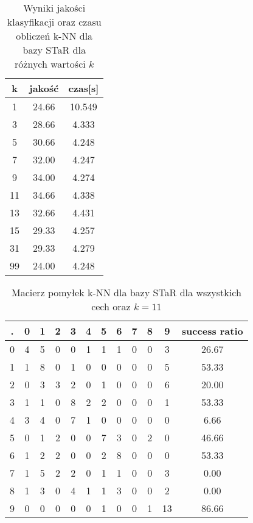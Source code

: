 \documentclass{classrep}
\begin{document}
\begin{table}[h!]
  \centering
  \caption{Wyniki jakości klasyfikacji oraz czasu obliczeń k-NN dla bazy STaR dla różnych wartości $k$}
  \label{tab:tab1}
  \begin{tabular}{|c|c|c|}
    \hline
	k & jakość & czas[s]\\
    \hline
	1 & 24.66 & 10.549\\
    \hline
	3 & 28.66 & 4.333\\
	\hline
	5 & 30.66 & 4.248\\
	\hline
	7 & 32.00 & 4.247\\
	\hline
	9 & 34.00 & 4.274\\
	\hline
	11 & 34.66 & 4.338\\
	\hline
	13 & 32.66 & 4.431\\
	\hline
	15 & 29.33 & 4.257\\
	\hline
	31 & 29.33 & 4.279\\
	\hline
	99 & 24.00 & 4.248\\
	\hline
  \end{tabular}
\end{table}

\begin{table}[h!]
  \centering
  \caption{Macierz pomyłek k-NN dla bazy STaR dla wszystkich cech oraz $k=11$}
  \label{tab:tab1}
  \begin{tabular}{|c|c|c|c|c|c|c|c|c|c|c|c|}
    \hline
	. & 0 & 1 & 2 & 3 & 4 & 5 & 6 & 7 & 8 & 9 & success ratio \\
    \hline
	0 & 4 & 5 & 0 & 0 & 1 & 1 & 1 & 0 & 0 & 3 & 26.67\\
    \hline
	1 & 1 & 8 & 0 & 1 & 0 & 0 & 0 & 0 & 0 & 5 & 53.33\\
	\hline
	2 & 0 & 3 & 3 & 2 & 0 & 1 & 0 & 0 & 0 & 6 & 20.00\\
	\hline
	3 & 1 & 1 & 0 & 8 & 2 & 2 & 0 & 0 & 0 & 1 & 53.33\\
	\hline
	4 & 3 & 4 & 0 & 7 & 1 & 0 & 0 & 0 & 0 & 0 & 6.66\\
	\hline
	5 & 0 & 1 & 2 & 0 & 0 & 7 & 3 & 0 & 2 & 0 & 46.66\\
	\hline
	6 & 1 & 2 & 2 & 0 & 0 & 2 & 8 & 0 & 0 & 0 & 53.33\\
	\hline
	7 & 1 & 5 & 2 & 2 & 0 & 1 & 1 & 0 & 0 & 3 & 0.00\\
	\hline
	8 & 1 & 3 & 0 & 4 & 1 & 1 & 3 & 0 & 0 & 2 & 0.00\\
	\hline
	9 & 0 & 0 & 0 & 0 & 0 & 1 & 0 & 0 & 1 & 13 & 86.66\\    
    \hline
  \end{tabular}
\end{table}
\end{document}
